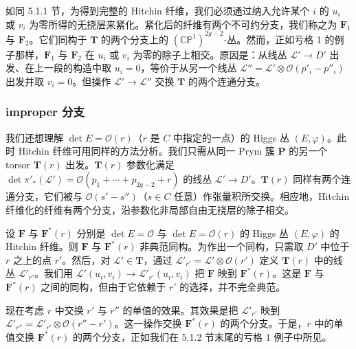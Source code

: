 \documentclass[11pt,a4paper]{article}
\begin{document}
如同 5.1.1 节，为得到完整的 Hitchin 纤维，我们必须通过纳入允许某个 $i$ 的 $u_i$ 或 $v_i$ 为零所得的无挠层来紧化。紧化后的纤维有两个不可约分支，我们称之为 $\boldsymbol{F}_1$ 与 $\boldsymbol{F}_2$。它们同构于 $\boldsymbol{T}$ 的两个分支上的 $(\mathbb{CP}^1)^{2g-2}$-丛。然而，正如亏格 1 的例子那样，$\boldsymbol{F}_1$ 与 $\boldsymbol{F}_2$ 在 $u_i$ 或 $v_i$ 为零的除子上相交。原因是：从线丛 $\mathcal{L}'\to D'$ 出发、在上一段的构造中取 $u_i=0$，等价于从另一个线丛 $\mathcal{L}'' = \mathcal{L}'\otimes\mathcal{O}(p'_i-p''_i)$ 出发并取 $v_i=0$。但操作 $\mathcal{L}'\to\mathcal{L}''$ 交换 $\boldsymbol{T}$ 的两个连通分支。


\subsubsection{improper 分支}

我们还想理解 $\det E = \mathcal{O}(r)$（$r$ 是 $C$ 中指定的一点）的 Higgs 丛 $(E,\varphi)$。此时 Hitchin 纤维可用同样的方法分析。我们只需从同一 Prym 簇 $\boldsymbol{P}$ 的另一个 torsor $\boldsymbol{T}(r)$ 出发。$\boldsymbol{T}(r)$ 参数化满足 $\det\pi'_*(\mathcal{L}') = \mathcal{O}(p_1+\cdots+p_{2g-2}+r)$ 的线丛 $\mathcal{L}'\to D'$。$\boldsymbol{T}(r)$ 同样有两个连通分支，它们被与 $\mathcal{O}(s'-s'')$（$s\in C$ 任意）作张量积所交换。相应地，Hitchin 纤维化的纤维有两个分支，沿参数化非局部自由无挠层的除子相交。

设 $\boldsymbol{F}$ 与 $\boldsymbol{F}^*(r)$ 分别是 $\det E = \mathcal{O}$ 与 $\det E = \mathcal{O}(r)$ 的 Higgs 丛 $(E,\varphi)$ 的 Hitchin 纤维。则 $\boldsymbol{F}$ 与 $\boldsymbol{F}^*(r)$ 非典范同构。为作出一个同构，只需取 $D'$ 中位于 $r$ 之上的点 $r'$。然后，对 $\mathcal{L}'\in\boldsymbol{T}$，通过 $\mathcal{L}'_{r'} = \mathcal{L}'\otimes\mathcal{O}(r')$ 定义 $\boldsymbol{T}(r)$ 中的线丛 $\mathcal{L}'_{r'}$。我们用 $\mathcal{L}'(u_i,v_i)\to\mathcal{L}'_{r'}(u_i,v_i)$ 把 $\boldsymbol{F}$ 映到 $\boldsymbol{F}^*(r)$。这是 $\boldsymbol{F}$ 与 $\boldsymbol{F}^*(r)$ 之间的同构，但由于它依赖于 $r'$ 的选择，并不完全典范。

现在考虑 $r$ 中交换 $r'$ 与 $r''$ 的单值的效果。其效果是把 $\mathcal{L}'_{r'}$ 映到 $\mathcal{L}'_{r''} = \mathcal{L}'_{r'}\otimes\mathcal{O}(r''-r')$。这一操作交换 $\boldsymbol{F}^*(r)$ 的两个分支。于是，$r$ 中的单值交换 $\boldsymbol{F}^*(r)$ 的两个分支，正如我们在 5.1.2 节末尾的亏格 1 例子中所见。
\end{document}
